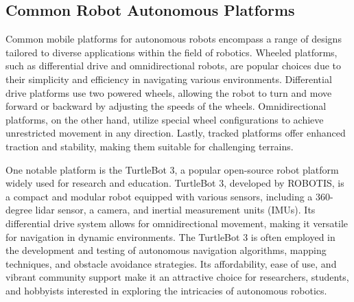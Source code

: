 \documentclass[conference]{IEEEtran}
\begin{document}
\subsection{Common Robot Autonomous Platforms} Common mobile platforms for autonomous robots encompass a range of designs tailored to diverse applications within the field of robotics. Wheeled platforms, such as differential drive and omnidirectional robots, are popular choices due to their simplicity and efficiency in navigating various environments. Differential drive platforms use two powered wheels, allowing the robot to turn and move forward or backward by adjusting the speeds of the wheels. Omnidirectional platforms, on the other hand, utilize special wheel configurations to achieve unrestricted movement in any direction. Lastly, tracked platforms offer enhanced traction and stability, making them suitable for challenging terrains.

One notable platform is the TurtleBot 3, a popular open-source robot platform widely used for research and education. TurtleBot 3, developed by ROBOTIS, is a compact and modular robot equipped with various sensors, including a 360-degree lidar sensor, a camera, and inertial measurement units (IMUs). Its differential drive system allows for omnidirectional movement, making it versatile for navigation in dynamic environments. The TurtleBot 3 is often employed in the development and testing of autonomous navigation algorithms, mapping techniques, and obstacle avoidance strategies. Its affordability, ease of use, and vibrant community support make it an attractive choice for researchers, students, and hobbyists interested in exploring the intricacies of autonomous robotics.
\end{document}
